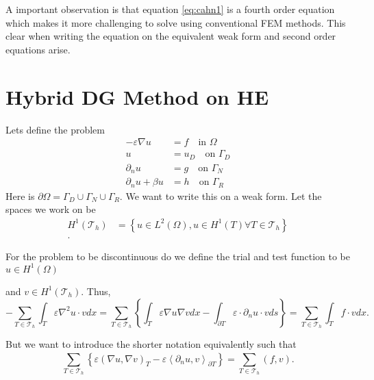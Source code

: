 A important observation is that equation \eqref{eq:cahn1} is a fourth order equation which makes it more challenging to
solve using conventional FEM methods. This clear when writing the equation on the equivalent weak form and second order
equations arise.


\newpage
\section{Hybrid DG Method on HE}%
\label{sec:hybrid_dg_method_on_he}


Lets define the problem \[
\begin{split}
    -\varepsilon \nabla u &= f \quad \text{in } \Omega   \\
    u&= u_{D} \quad \text{on } \Gamma _{D} \\
    \partial _{n} u & = g \quad \text{on } \Gamma _{N} \\
    \partial _{n} u +  \beta u & = h \quad \text{on } \Gamma _{R}
\end{split}
\]
Here is $\partial \Omega  = \Gamma _{D} \cup \Gamma _{N} \cup \Gamma _{R}$. We want to write this on a weak form. Let
the spaces we work on be \[
    \begin{split}
H^{1}\left( \mathcal{T}_{h}  \right) & = \left\{ u \in L^2\left( \Omega  \right), u \in H^{1 } \left( T \right) \forall T
\in  \mathcal{T} _{h }\right\} \\.
    \end{split}
\]

For the problem to be discontinuous do we define the trial and test function to be $u \in H^{1 }\left( \Omega  \right) $

and $v \in H^{1 } \left( \mathcal{T} _{h} \right)$. Thus,
\begin{equation}
\label{eq:1a}
- \sum_{T \in \mathcal{T} _{h}}^{} \int_{ T}^{}   \varepsilon \nabla ^2 u \cdot v dx = \sum_{T \in \mathcal{T}_{h} }^{}
\left\{ \int_{T}^{} \varepsilon \nabla u \nabla v dx - \int_{\partial T}^{} \varepsilon\cdot  \partial _{n} u \cdot v ds
\right\} = \sum_{T \in \mathcal{T} _{h}}^{}  \int_{T}^{} f\cdot v dx
.\end{equation}

But we want to introduce the shorter notation equivalently such that
\begin{equation}
\label{eq:1b}
   \sum_{T \in \mathcal{T} _{h}}^{}
     \left\{ \varepsilon\left( \nabla u, \nabla v \right) _{T} -\varepsilon \left<\partial _{n} u,v \right>_{\partial T} \right\} = \sum_{T \in
  \mathcal{T} _{h}}^{}  \left( f,v \right)
.\end{equation}

